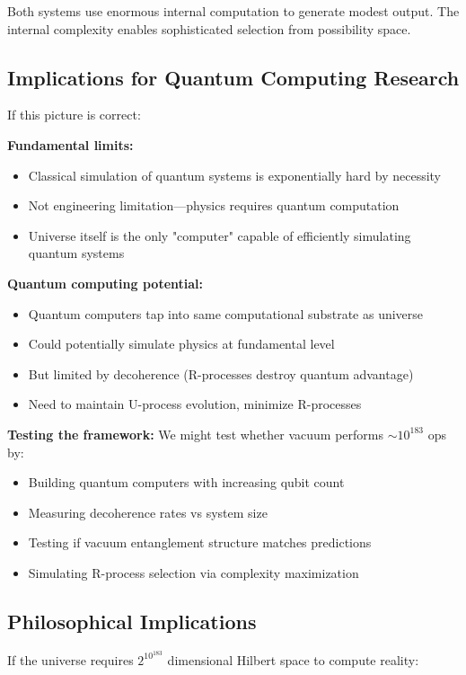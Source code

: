 Both systems use enormous internal computation to generate modest output. The internal complexity enables sophisticated selection from possibility space.

\subsection{Implications for Quantum Computing Research}

If this picture is correct:

\textbf{Fundamental limits:}
\begin{itemize}
\item Classical simulation of quantum systems is exponentially hard by necessity
\item Not engineering limitation—physics requires quantum computation
\item Universe itself is the only "computer" capable of efficiently simulating quantum systems
\end{itemize}

\textbf{Quantum computing potential:}
\begin{itemize}
\item Quantum computers tap into same computational substrate as universe
\item Could potentially simulate physics at fundamental level
\item But limited by decoherence (R-processes destroy quantum advantage)
\item Need to maintain U-process evolution, minimize R-processes
\end{itemize}

\textbf{Testing the framework:}
We might test whether vacuum performs $\sim 10^{183}$ ops by:
\begin{itemize}
\item Building quantum computers with increasing qubit count
\item Measuring decoherence rates vs system size
\item Testing if vacuum entanglement structure matches predictions
\item Simulating R-process selection via complexity maximization
\end{itemize}

\subsection{Philosophical Implications}

If the universe requires $2^{10^{183}}$ dimensional Hilbert space to compute reality:


